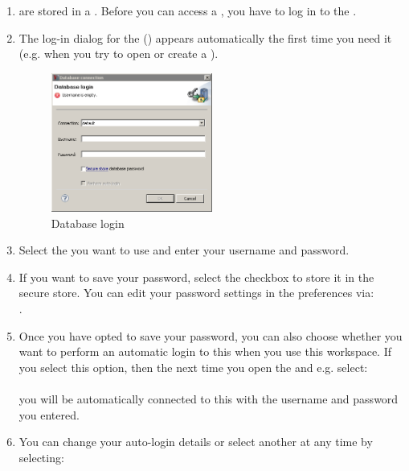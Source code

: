 \begin{enumerate}
\item \gdprojects{} are stored in  a \gddb{}. Before you can access a \gdproject{}, you have to log in to the \gddb{}. 
\item The log-in dialog for the \gddb{} () appears automatically the first time you need it (e.g. when you try to open or create a \gdproject{}). 

\begin{figure}[h]
\begin{center}
\includegraphics[width=0.5\textwidth]{Tasks/Database/PS/dblogin}
\caption{Database login}
\label{dblogin}
\end{center}
\end{figure}



\item Select the \gddb{} you want to use and enter your username and password.


\item If you want to save your \gddb{} password, select the checkbox to store it in the secure store. You can edit your password settings in the preferences via: \\
. 
\item Once you have opted to save your password, you can also choose whether you want to perform an automatic login to this \gddb{} when you use this workspace. If you select this option, then the next time you open the \ite{} and e.g. select:\\
\\
you will be automatically connected to this \gddb{} with the username and password you entered.
\item You can change your auto-login details or select another \gddb{} at any time by selecting:\\
\end{enumerate}

